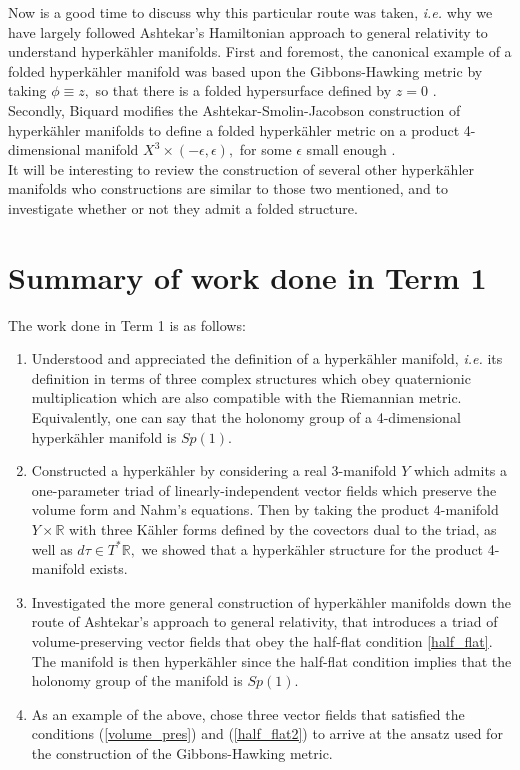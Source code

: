 \documentclass[a4paper,onecolumn,12pt]{article}
\theoremstyle{definition}
\theoremstyle{remark}
\newcommand{\ie}{\emph{i.e.} }
\newcommand{\e}{\epsilon}
\newcommand{\K}{K\"ahler }
\newcommand{\HK}{hyperk\"ahler }
\newcommand{\R}{\mathbb{R}}
\begin{document}
Now is a good time to discuss why this particular route was taken, \ie why we have largely followed Ashtekar's Hamiltonian approach to general relativity to understand \HK manifolds. First and foremost, the canonical example of a folded \HK manifold was based upon the Gibbons-Hawking metric by taking $\phi\equiv z,$ so that there is a folded hypersurface defined by $z=0$ \cite{hitchin_2015}.\\
Secondly, Biquard modifies the Ashtekar-Smolin-Jacobson construction of \HK manifolds to define a folded \HK metric on a product 4-dimensional manifold $X^{3}\times(-\e,\e),$ for some $\e$ small enough \cite{biquard_2015}.\\
It will be interesting to review the construction of several other \HK manifolds who constructions are similar to those two mentioned, and to investigate whether or not they admit a folded structure.

\section{Summary of work done in Term 1}
The work done in Term 1 is as follows:

\begin{enumerate}
	\item Understood and appreciated the definition of a \HK manifold, \ie its definition in terms of three complex structures which obey quaternionic multiplication which are also compatible with the Riemannian metric. Equivalently, one can say that the holonomy group of a 4-dimensional \HK manifold is $Sp(1).$
	\item Constructed a \HK by considering a real 3-manifold $Y$ which admits a one-parameter triad of linearly-independent vector fields which preserve the volume form and Nahm's equations. Then by taking the product 4-manifold $Y\times\R$ with three \K forms defined by the covectors dual to the triad, as well as $d\tau\in T^{*}\R,$ we showed that a \HK structure for the product 4-manifold exists.
	\item Investigated the more general construction of \HK manifolds down the route of Ashtekar's approach to general relativity, that introduces a triad of volume-preserving vector fields that obey the half-flat condition \ref{half_flat}. The manifold is then \HK since the half-flat condition implies that the holonomy group of the manifold is $Sp(1).$
	\item As an example of the above, chose three vector fields that satisfied the conditions (\ref{volume_pres}) and (\ref{half_flat2}) to arrive at the ansatz used for the construction of the Gibbons-Hawking metric.
\end{enumerate}
\end{document}
